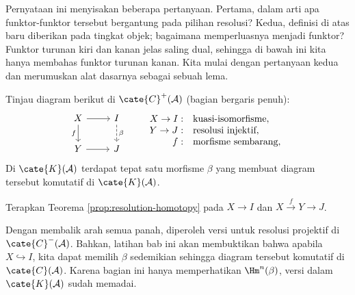 Pernyataan ini menyisakan beberapa pertanyaan. Pertama, dalam arti apa funktor-funktor tersebut bergantung pada pilihan resolusi? Kedua, definisi di atas baru diberikan pada tingkat objek; bagaimana memperluasnya menjadi funktor? Funktor turunan kiri dan kanan jelas saling dual, sehingga di bawah ini kita hanya membahas funktor turunan kanan. Kita mulai dengan pertanyaan kedua dan merumuskan alat dasarnya sebagai sebuah lema.

\begin{lema}\label{prop:resolution-homotopy-classical}
	Tinjau diagram berikut di $\cate{C}^+(\mathcal{A})$ (bagian bergaris penuh):
	\[\begin{tikzcd}
		X \arrow[d, "f"'] \arrow[r] & I \arrow[dashed, d, "\beta"]\\
		Y \arrow[r] & J
	\end{tikzcd} \qquad \begin{array}{rl}
		X \to I: & \text{kuasi-isomorfisme}, \\
		Y \to J: & \text{resolusi injektif}, \\
		f: & \text{morfisme sembarang},
	\end{array}\]
	Di $\cate{K}(\mathcal{A})$ terdapat tepat satu morfisme $\beta$ yang membuat diagram tersebut komutatif di $\cate{K}(\mathcal{A})$.
\end{lema}
\begin{bukti}
	Terapkan Teorema \ref{prop:resolution-homotopy} pada $X \to I$ dan $X \xrightarrow{f} Y \to J$.
\end{bukti}

Dengan membalik arah semua panah, diperoleh versi untuk resolusi projektif di $\cate{C}^-(\mathcal{A})$. Bahkan, latihan bab ini akan membuktikan bahwa apabila $X \hookrightarrow I$, kita dapat memilih $\beta$ sedemikian sehingga diagram tersebut komutatif di $\cate{C}(\mathcal{A})$. Karena bagian ini hanya memperhatikan $\Hm^n(\beta)$, versi dalam $\cate{K}(\mathcal{A})$ sudah memadai.


